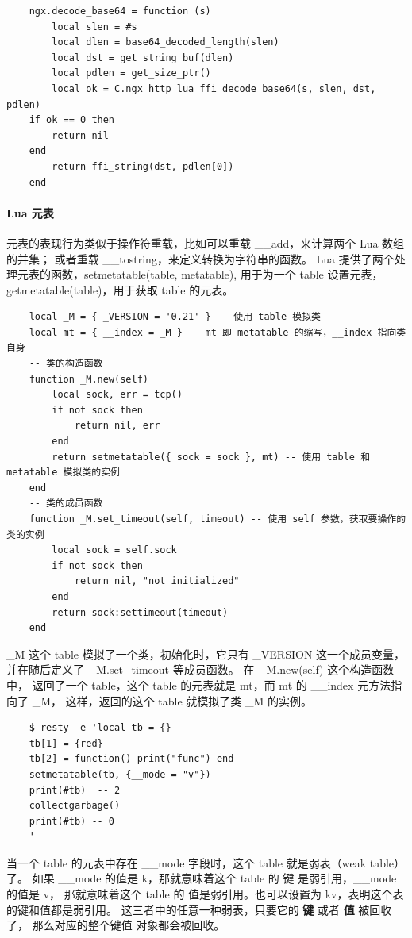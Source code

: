\documentclass[a4,10pt]{ctexart}
\begin{document}
\begin{verbatim}
	ngx.decode_base64 = function (s)
		local slen = #s
		local dlen = base64_decoded_length(slen)
		local dst = get_string_buf(dlen)
		local pdlen = get_size_ptr()
		local ok = C.ngx_http_lua_ffi_decode_base64(s, slen, dst, pdlen)
	if ok == 0 then
		return nil
	end
		return ffi_string(dst, pdlen[0])
	end
\end{verbatim}

\paragraph{Lua 元表}

元表的表现行为类似于操作符重载，比如可以重载 \_\_add，来计算两个 Lua 数组的并集；
或者重载 \_\_tostring，来定义转换为字符串的函数。
Lua 提供了两个处理元表的函数，setmetatable(table, metatable), 
用于为一个 table 设置元表，getmetatable(table)，用于获取 table 的元表。


\begin{verbatim}
	local _M = { _VERSION = '0.21' } -- 使用 table 模拟类
	local mt = { __index = _M } -- mt 即 metatable 的缩写，__index 指向类自身
	-- 类的构造函数
	function _M.new(self) 
		local sock, err = tcp()
		if not sock then
			return nil, err
		end
		return setmetatable({ sock = sock }, mt) -- 使用 table 和 metatable 模拟类的实例
	end
	-- 类的成员函数
	function _M.set_timeout(self, timeout) -- 使用 self 参数，获取要操作的类的实例
		local sock = self.sock
		if not sock then
			return nil, "not initialized"
		end
		return sock:settimeout(timeout)
	end
\end{verbatim}

\_M 这个 table 模拟了一个类，初始化时，它只有 \_VERSION 这一个成员变量，
并在随后定义了 \_M.set\_timeout 等成员函数。
在 \_M.new(self) 这个构造函数中，
返回了一个 table，这个 table 的元表就是 mt，而 mt 的 \_\_index 元方法指向了 \_M，
这样，返回的这个 table 就模拟了类 \_M 的实例。

\begin{verbatim}
	$ resty -e 'local tb = {}
	tb[1] = {red}
	tb[2] = function() print("func") end
	setmetatable(tb, {__mode = "v"})
	print(#tb)  -- 2
	collectgarbage()
	print(#tb) -- 0
	'
\end{verbatim}

当一个 table 的元表中存在 \_\_mode 字段时，这个 table 就是弱表（weak table）了。
如果 \_\_mode 的值是 k，那就意味着这个 table 的 键 是弱引用，\_\_mode 的值是 v，
那就意味着这个 table 的 值是弱引用。也可以设置为 kv，表明这个表的键和值都是弱引用。
这三者中的任意一种弱表，只要它的 \textbf{键} 或者 \textbf{值} 被回收了，
那么对应的整个键值 对象都会被回收。
\end{document}
